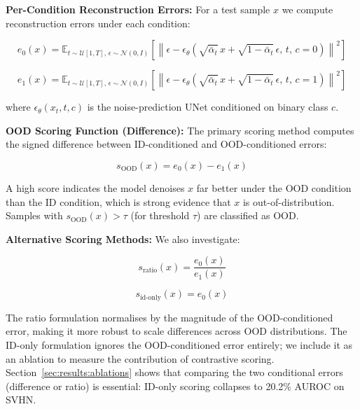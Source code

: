 \textbf{Per-Condition Reconstruction Errors:} For a test sample $x$ we compute reconstruction errors under each condition:

\begin{equation}
\label{eq:meth:e0}
e_0(x) = \mathbb{E}_{t \sim \mathcal{U}[1,T],\, \epsilon \sim \mathcal{N}(0,I)} \left[ \left\| \epsilon - \epsilon_\theta\!\left( \sqrt{\bar{\alpha}_t}\, x + \sqrt{1 - \bar{\alpha}_t}\, \epsilon,\, t,\, c{=}0 \right) \right\|^2 \right]
\end{equation}

\begin{equation}
\label{eq:meth:e1}
e_1(x) = \mathbb{E}_{t \sim \mathcal{U}[1,T],\, \epsilon \sim \mathcal{N}(0,I)} \left[ \left\| \epsilon - \epsilon_\theta\!\left( \sqrt{\bar{\alpha}_t}\, x + \sqrt{1 - \bar{\alpha}_t}\, \epsilon,\, t,\, c{=}1 \right) \right\|^2 \right]
\end{equation}

where $\epsilon_\theta(x_t, t, c)$ is the noise-prediction UNet conditioned on binary class $c$.

\textbf{OOD Scoring Function (Difference):} The primary scoring method computes the signed difference between ID-conditioned and OOD-conditioned errors:

\begin{equation}
\label{eq:meth:sood}
s_{\text{OOD}}(x) = e_0(x) - e_1(x)
\end{equation}

A high score indicates the model denoises $x$ far better under the OOD condition than the ID condition, which is strong evidence that $x$ is out-of-distribution. Samples with $s_{\text{OOD}}(x) > \tau$ (for threshold $\tau$) are classified as OOD.

\textbf{Alternative Scoring Methods:} We also investigate:

\begin{equation}
\label{eq:meth:sratio}
s_{\text{ratio}}(x) = \frac{e_0(x)}{e_1(x)}
\end{equation}

\begin{equation}
\label{eq:meth:sidonly}
s_{\text{id-only}}(x) = e_0(x)
\end{equation}

The ratio formulation normalises by the magnitude of the OOD-conditioned error, making it more robust to scale differences across OOD distributions. The ID-only formulation ignores the OOD-conditioned error entirely; we include it as an ablation to measure the contribution of contrastive scoring. Section~\ref{sec:results:ablations} shows that comparing the two conditional errors (difference or ratio) is essential: ID-only scoring collapses to 20.2\% AUROC on SVHN.

